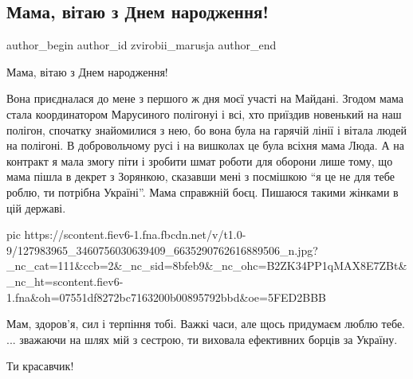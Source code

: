  
 
 
 
 
 
\subsection{Мама, вітаю з Днем народження!}
\label{sec:27_11_2020.fb.zvirobii_marusja.2.mama}
\ifcmt
	author_begin
   author_id zvirobii_marusja
	author_end
\fi

Мама, вітаю з Днем народження!

Вона приєдналася до мене з першого ж дня моєї участі на Майдані. Згодом мама
стала координатором Марусиного полігонуі і всі, хто приїздив новенький на наш
полігон, спочатку знайомилися з нею, бо вона була на гарячій лінії і вітала
людей на полігоні. В добровольчому русі і на вишколах це була всіхня мама Люда.
А на контракт я мала змогу піти і зробити шмат роботи для оборони лише тому, що
мама пішла в декрет з Зорянкою, сказавши мені з посмішкою \enquote{я це не для тебе
роблю, ти потрібна Україні}. Мама справжній боєц. Пишаюся такими жінками в цій
державі.

\ifcmt
pic https://scontent.fiev6-1.fna.fbcdn.net/v/t1.0-9/127983965_3460756030639409_6635290762616889506_n.jpg?_nc_cat=111&ccb=2&_nc_sid=8bfeb9&_nc_ohc=B2ZK34PP1qMAX8E7ZBt&_nc_ht=scontent.fiev6-1.fna&oh=07551df8272bc7163200b00895792bbd&oe=5FED2BBB
\fi

Мам, здоров'я, сил і терпіння тобі. Важкі часи, але щось придумаєм  люблю тебе.
... зважаючи на шлях мій з сестрою, ти виховала ефективних борців за Україну.

Ти красавчик!
